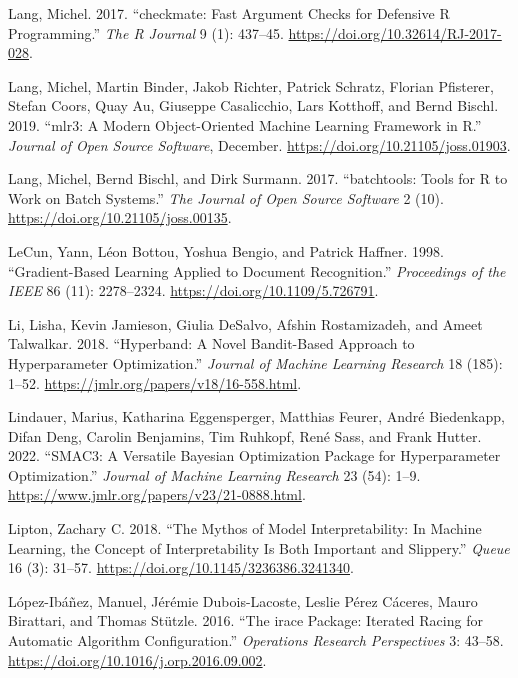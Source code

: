 \begin{CSLReferences}{1}{0}
\leavevmode{}%
Lang, Michel. 2017. {``{checkmate}: Fast Argument Checks for Defensive
{R} Programming.''} \emph{The {R} Journal} 9 (1): 437--45.
\url{https://doi.org/10.32614/RJ-2017-028}.

\leavevmode{}%
Lang, Michel, Martin Binder, Jakob Richter, Patrick Schratz, Florian
Pfisterer, Stefan Coors, Quay Au, Giuseppe Casalicchio, Lars Kotthoff,
and Bernd Bischl. 2019. {``{mlr3}: A Modern Object-Oriented Machine
Learning Framework in {R}.''} \emph{Journal of Open Source Software},
December. \url{https://doi.org/10.21105/joss.01903}.

\leavevmode{}%
Lang, Michel, Bernd Bischl, and Dirk Surmann. 2017. {``{batchtools}:
Tools for {R} to Work on Batch Systems.''} \emph{The Journal of Open
Source Software} 2 (10). \url{https://doi.org/10.21105/joss.00135}.

\leavevmode{}%
LeCun, Yann, Léon Bottou, Yoshua Bengio, and Patrick Haffner. 1998.
{``Gradient-Based Learning Applied to Document Recognition.''}
\emph{Proceedings of the IEEE} 86 (11): 2278--2324.
\url{https://doi.org/10.1109/5.726791}.

\leavevmode{}%
Li, Lisha, Kevin Jamieson, Giulia DeSalvo, Afshin Rostamizadeh, and
Ameet Talwalkar. 2018. {``Hyperband: A Novel Bandit-Based Approach to
Hyperparameter Optimization.''} \emph{Journal of Machine Learning
Research} 18 (185): 1--52.
\url{https://jmlr.org/papers/v18/16-558.html}.

\leavevmode{}%
Lindauer, Marius, Katharina Eggensperger, Matthias Feurer, André
Biedenkapp, Difan Deng, Carolin Benjamins, Tim Ruhkopf, René Sass, and
Frank Hutter. 2022. {``{SMAC3}: A Versatile Bayesian Optimization
Package for Hyperparameter Optimization.''} \emph{Journal of Machine
Learning Research} 23 (54): 1--9.
\url{https://www.jmlr.org/papers/v23/21-0888.html}.

\leavevmode{}%
Lipton, Zachary C. 2018. {``The Mythos of Model Interpretability: In
Machine Learning, the Concept of Interpretability Is Both Important and
Slippery.''} \emph{Queue} 16 (3): 31--57.
\url{https://doi.org/10.1145/3236386.3241340}.

\leavevmode{}%
López-Ibáñez, Manuel, Jérémie Dubois-Lacoste, Leslie Pérez Cáceres,
Mauro Birattari, and Thomas Stützle. 2016. {``The {irace} Package:
Iterated Racing for Automatic Algorithm Configuration.''}
\emph{Operations Research Perspectives} 3: 43--58.
\url{https://doi.org/10.1016/j.orp.2016.09.002}.


\end{CSLReferences}
